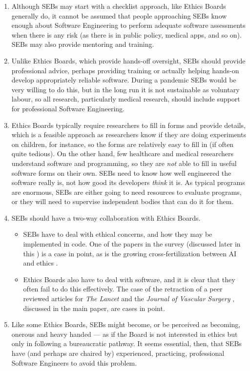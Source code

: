 \documentclass[10pt,a4paper]{article}
\begin{document}
\begin{enumerate}\raggedright
\item 
Although SEBs may start with a checklist approach, like Ethics Boards generally do, it cannot be assumed that people approaching SEBs know enough about Software Engineering to perform adequate software assessments when there is any risk (as there is in public policy, medical apps, and so on). SEBs may also provide mentoring and training.

\item
Unlike Ethics Boards, which provide hands-off oversight, SEBs should provide professional advice, perhaps providing training or actually helping hands-on develop appropriately reliable software. During a pandemic SEBs would be very willing to do this, but in the long run it is not sustainable as voluntary labour, so all research, particularly medical research, should include support for professional Software Engineering. 

\item 
Ethics Boards typically require researchers to fill in forms and provide details, which is a feasible approach as researchers know if they are doing experiments on children, for instance, so the forms are relatively easy to fill in (if often quite tedious). On the other hand, few healthcare and medical researchers understand software and programming, so they are \emph{not\/} able to fill in useful software forms on their own. SEBs need to know how well engineered the software really is, not how good its developers \emph{think\/} it is. As typical programs are enormous, SEBs are either going to need resources to evaluate programs, or they will need to supervise independent bodies that can do it for them. 

\item
SEBs should have a two-way collaboration with Ethics Boards. 

\begin{itemize}
\item SEBs have to deal with ethical concerns, and how they may be implemented in code. One of the papers \cite{ethics-paper} in the survey (discussed later in this \supplement) is a case in point, as is the growing cross-fertilization between AI and ethics .

\item Ethics Boards also have to deal with software, and it is clear that they often fail to do this effectively. The case of the retraction of a peer reviewed articles for \emph{The Lancet\/} \cite{science-lancet1,science-lancet2,lancet-learning} and the \emph{Journal of Vascular Surgery\/} \cite{jvs1,jvs2,jvs3}, discussed in the main paper, are cases in point.
\end{itemize}

\item
Like some Ethics Boards, SEBs might become, or be perceived as becoming, onerous and heavy handed --- as if the Board is not interested in ethics but only in following a bureaucratic pathway. It seems essential, then, that SEBs have (and perhaps are chaired by) experienced, practicing, professional Software Engineers to avoid this problem. 
\end{enumerate}
\end{document}
